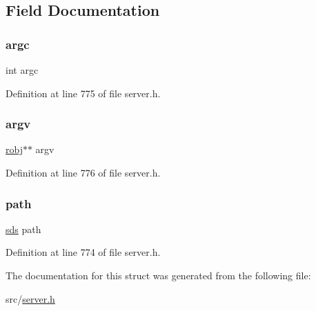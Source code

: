 \subsection{Field Documentation}
\mbox{\label{structmodule_load_queue_entry_ad1447518f4372828b8435ae82e48499e}} 
\subsubsection{\texorpdfstring{argc}{argc}}
{\footnotesize\ttfamily int argc}



Definition at line 775 of file server.\+h.

\mbox{\label{structmodule_load_queue_entry_a5c75dd3cb8eb8a3f5be7d4fdf48a9ef9}} 
\subsubsection{\texorpdfstring{argv}{argv}}
{\footnotesize\ttfamily \hyperlink{server_8h_a540f174d2685422fbd7d12e3cd44c8e2}{robj}$\ast$$\ast$ argv}



Definition at line 776 of file server.\+h.

\mbox{\label{structmodule_load_queue_entry_aafb87a9eb5c5cc5c4d0e278bea7fdbe3}} 
\subsubsection{\texorpdfstring{path}{path}}
{\footnotesize\ttfamily \hyperlink{sds_8h_ad69abac3df4532879db9642c95f5ef6f}{sds} path}



Definition at line 774 of file server.\+h.



The documentation for this struct was generated from the following file\+:\begin{DoxyCompactItemize}
\item 
src/\hyperlink{server_8h}{server.\+h}\end{DoxyCompactItemize}
